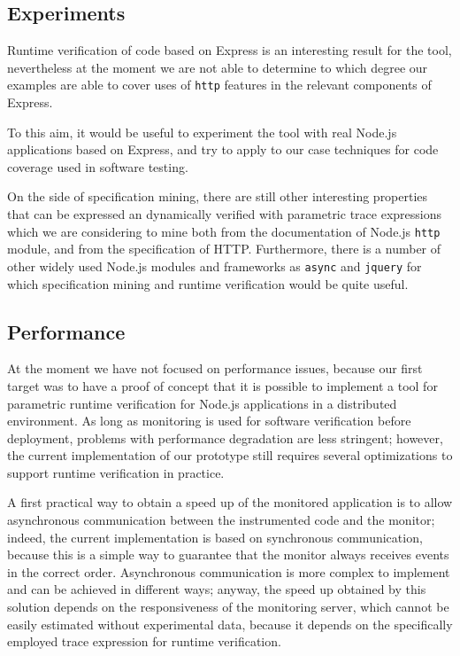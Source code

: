 \subsection{Experiments}
Runtime verification of code based on Express is an interesting result for the tool, nevertheless
at the moment we are not able to determine to which degree our examples are able to
cover uses of \lstinline{http} features in the relevant components of Express.

To this aim, it would be useful to experiment the tool with real Node.js applications
based on Express, and try to apply to our case techniques for code coverage \cite{artho2005combining} used in software testing.

On the side of specification mining, there are still other interesting properties that can be expressed an dynamically
verified with parametric trace expressions which we are considering to mine both from the documentation of Node.js
\lstinline{http} module, and from the specification of HTTP. Furthermore, there is a number of other widely used Node.js
modules and frameworks as \lstinline{async} and \lstinline{jquery} for which specification mining and runtime
verification would be quite useful.

\subsection{Performance}
At the moment we have not focused on performance issues, because our first target was to have a proof of concept
that it is possible to implement a tool for parametric runtime verification for Node.js applications in a distributed environment.
As long as monitoring is used for software verification before deployment, problems with performance degradation are less 
stringent; however, the current implementation of our prototype still requires several optimizations to support runtime verification
in practice.

A first practical way to obtain a speed up of the monitored application is to
allow asynchronous communication between the instrumented code and the monitor;
indeed, the current implementation is based on synchronous communication, because this is
a simple way to guarantee that the monitor always receives events in the correct order.
Asynchronous communication is more complex to implement and can be achieved in different ways;
anyway, the speed up obtained by this solution depends on the responsiveness of the monitoring server,
which cannot be easily estimated without experimental data, because it depends on the specifically employed trace expression
for runtime verification.

